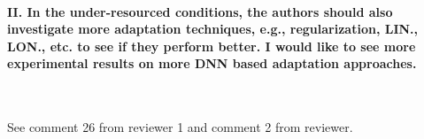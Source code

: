 \documentclass[]{article}
\begin{document}
\paragraph{II. In the under-resourced conditions, the authors should also investigate more adaptation techniques, e.g., regularization, LIN., LON., etc. to see if they perform better. I would like to see more experimental results on more DNN based adaptation approaches.}

~

See comment 26 from reviewer 1 and comment 2 from reviewer.
\end{document}

